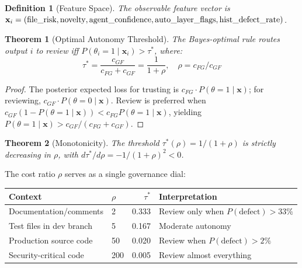 \documentclass[11pt, a4paper, copyright]{googledeepmind}
\newtheorem{definition}{Definition}[section]
\newtheorem{theorem}{Theorem}[section]
\begin{document}
\begin{definition}[Feature Space]
\label{def:features}
The observable feature vector is $\mathbf{x}_i = (\textup{file\_risk}, \textup{novelty}, \textup{agent\_confidence}, \textup{auto\_layer\_flags}, \textup{hist\_defect\_rate})$.
\end{definition}

\begin{theorem}[Optimal Autonomy Threshold]
\label{thm:threshold}
The Bayes-optimal rule routes output $i$ to review iff $P(\theta_i = 1 \mid \mathbf{x}_i) > \tau^*$, where:
\begin{equation}
\tau^* = \frac{c_{GF}}{c_{FG} + c_{GF}} = \frac{1}{1 + \rho}, \quad \rho = c_{FG}/c_{GF}
\end{equation}
\end{theorem}

\begin{proof}
The posterior expected loss for trusting is $c_{FG} \cdot P(\theta = 1 \mid \mathbf{x})$; for reviewing, $c_{GF} \cdot P(\theta = 0 \mid \mathbf{x})$. Review is preferred when $c_{GF}(1 - P(\theta = 1 \mid \mathbf{x})) < c_{FG} P(\theta = 1 \mid \mathbf{x})$, yielding $P(\theta = 1 \mid \mathbf{x}) > c_{GF}/(c_{FG} + c_{GF})$.
\end{proof}

\begin{theorem}[Monotonicity]
\label{thm:monotonicity}
The threshold $\tau^*(\rho) = 1/(1+\rho)$ is strictly decreasing in $\rho$, with $d\tau^*/d\rho = -1/(1+\rho)^2 < 0$.
\end{theorem}

The cost ratio $\rho$ serves as a single governance dial:

\begin{center}
\small
\begin{tabular}{llrl}
\toprule
\textbf{Context} & $\rho$ & $\tau^*$ & \textbf{Interpretation} \\
\midrule
Documentation/comments & 2 & 0.333 & Review only when $P(\text{defect}) > 33\%$ \\
Test files in dev branch & 5 & 0.167 & Moderate autonomy \\
Production source code & 50 & 0.020 & Review when $P(\text{defect}) > 2\%$ \\
Security-critical code & 200 & 0.005 & Review almost everything \\
\bottomrule
\end{tabular}
\end{center}
\end{document}
